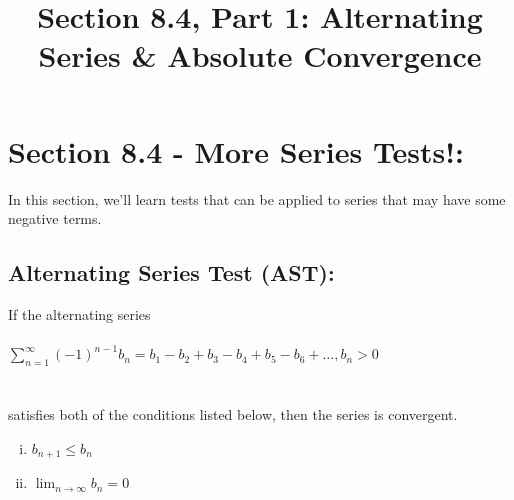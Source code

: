 \documentclass[10pt]{article}
\begin{document}
\newcommand{\an}{\lbrace a_n \rbrace}
\newcommand{\Sum}{\sum_{n=1}^\infty }

\everymath{\displaystyle}

\renewcommand{\myTitle}{MATH 1336: Calculus III}

\renewcommand{\mySubTitle}{Section 8.4, Part 1:  Alternating Series \& Absolute Convergence }

\title{\mySubTitle}\date{}
\maketitle




\setlength{\columnseprule}{.4pt}
\setlength{\columnsep}{3em}

\section*{Section 8.4 - More Series Tests!: }
In this section, we'll learn tests that can be applied to series that may have some negative terms.\\

\vspace*{.1in}




\subsection*{Alternating Series Test (AST):}
If the alternating series\\ ~\\
\(\Sum (-1)^{n-1} b_n = b_1 - b_2 + b_3 - b_4 + b_5 - b_6+ \ldots, b_n>0\)\\~\\~\\
 satisfies both of the conditions listed below, then the series is convergent.
 \begin{enumerate}[(i)] 
 \item \(b_{n+1} \leq b_n\)
 \item \(\lim_{n\rightarrow \infty} b_n = 0\)
 \end{enumerate} 
 
\end{document}
